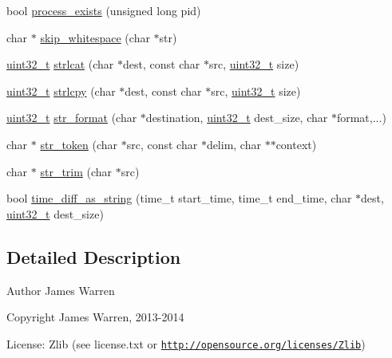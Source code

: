 \begin{DoxyCompactItemize}
bool \hyperlink{utils_8cc_af1f4e916381d9c267c7c8d8997ed48dd}{process\-\_\-exists} (unsigned long pid)
\item 
char $\ast$ \hyperlink{utils_8cc_afca003914e08d83abdda7e88d58e50fe}{skip\-\_\-whitespace} (char $\ast$str)
\item 
\hyperlink{stdint_8h_a435d1572bf3f880d55459d9805097f62}{uint32\-\_\-t} \hyperlink{utils_8cc_a2ff8cc269a34ae7e565ed7663dc2eb3a}{strlcat} (char $\ast$dest, const char $\ast$src, \hyperlink{stdint_8h_a435d1572bf3f880d55459d9805097f62}{uint32\-\_\-t} size)
\item 
\hyperlink{stdint_8h_a435d1572bf3f880d55459d9805097f62}{uint32\-\_\-t} \hyperlink{utils_8cc_a63a72ee56ddf07d1f097f4425c1cb38b}{strlcpy} (char $\ast$dest, const char $\ast$src, \hyperlink{stdint_8h_a435d1572bf3f880d55459d9805097f62}{uint32\-\_\-t} size)
\item 
\hyperlink{stdint_8h_a435d1572bf3f880d55459d9805097f62}{uint32\-\_\-t} \hyperlink{utils_8cc_a3028decc6adec38215582336b1584387}{str\-\_\-format} (char $\ast$destination, \hyperlink{stdint_8h_a435d1572bf3f880d55459d9805097f62}{uint32\-\_\-t} dest\-\_\-size, char $\ast$format,...)
\item 
char $\ast$ \hyperlink{utils_8cc_aaae417a5be0043adcf2646caebfab69a}{str\-\_\-token} (char $\ast$src, const char $\ast$delim, char $\ast$$\ast$context)
\item 
char $\ast$ \hyperlink{utils_8cc_ae449a29602e667a885747f7f1f06c8dd}{str\-\_\-trim} (char $\ast$src)
\item 
bool \hyperlink{utils_8cc_adb56a00005481d819a7e43b724b1d748}{time\-\_\-diff\-\_\-as\-\_\-string} (time\-\_\-t start\-\_\-time, time\-\_\-t end\-\_\-time, char $\ast$dest, \hyperlink{stdint_8h_a435d1572bf3f880d55459d9805097f62}{uint32\-\_\-t} dest\-\_\-size)
\end{DoxyCompactItemize}


\subsection{Detailed Description}
\begin{DoxyAuthor}{Author}
James Warren 
\end{DoxyAuthor}
\begin{DoxyCopyright}{Copyright}
James Warren, 2013-\/2014 
\end{DoxyCopyright}
\begin{DoxyParagraph}{License\-:}
Zlib (see license.\-txt or \href{http://opensource.org/licenses/Zlib}{\tt http\-://opensource.\-org/licenses/\-Zlib}) 
\end{DoxyParagraph}


